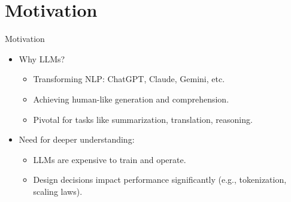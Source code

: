 \section{Motivation}
\begin{frame}{Motivation}
    \begin{itemize}
        \item Why LLMs?
        \begin{itemize}
            \item Transforming NLP: ChatGPT, Claude, Gemini, etc.
            \item Achieving human-like generation and comprehension.
            \item Pivotal for tasks like summarization, translation, reasoning.
        \end{itemize}
        \item Need for deeper understanding:
        \begin{itemize}
            \item LLMs are expensive to train and operate.
            \item Design decisions impact performance significantly (e.g., tokenization, scaling laws).
        \end{itemize}
    \end{itemize}
\end{frame}